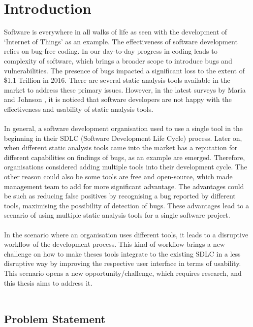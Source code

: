 \chapter{Introduction}
\label{ch:introduction_report}

Software is everywhere in all walks of life as seen with the development of ‘Internet of Things’ as an example. The effectiveness of software development relies on bug-free coding. In our day-to-day progress in coding leads to complexity of software, which brings a broader scope to introduce bugs and vulnerabilities. The presence of bugs impacted a significant loss to the extent of \$1.1 Trillion in 2016. \cite{report} There are several static analysis tools available in the market to address these primary issues. However, in the latest surveys by Maria \etal{} \cite{CB16} and Johnson \etal{} \cite{JSMB13}, it is noticed that software developers are not happy with the effectiveness and usability of static analysis tools.
\\ \\

In general, a software development organisation used to use a single tool in the beginning in their SDLC (Software Development Life Cycle) process. Later on, when different static analysis tools came into the market has a reputation for different capabilities on findings of bugs, as an example are emerged. Therefore, organisations considered adding multiple tools into their development cycle. The other reason could also be some tools are free and open-source, which made management team to add for more significant advantage. The advantages could be such as reducing false positives by recognising a bug reported by different tools, maximising the possibility of detection of bugs. These advantages lead to a scenario of using multiple static analysis tools for a single software project.
\\ \\

In the scenario where an organisation uses different tools, it leads to a disruptive workflow of the development process. This kind of workflow brings a new challenge on how to make theses tools integrate to the existing SDLC in a less disruptive way by improving the respective user interface in terms of usability. This scenario opens a new opportunity/challenge, which requires research, and this thesis aims to address it.
\\ \\
\clearpage

\section{Problem Statement}

